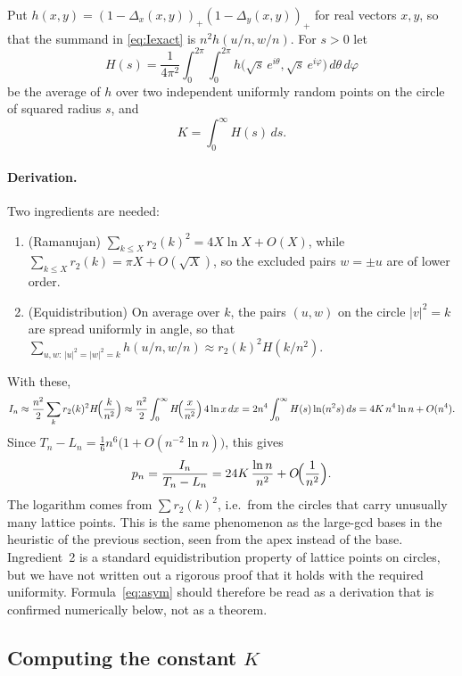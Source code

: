 \documentclass[11pt,a4paper]{article}
\theoremstyle{remark}
\begin{document}
Put $h(x,y)=(1-\Delta_x(x,y))_+(1-\Delta_y(x,y))_+$ for real vectors $x,y$, so that
the summand in \eqref{eq:Iexact} is $n^2h(u/n,w/n)$. For $s>0$ let
\[
  H(s)=\frac1{4\pi^2}\int_0^{2\pi}\!\!\int_0^{2\pi}
  h\bigl(\sqrt s\,e^{i\theta},\sqrt s\,e^{i\varphi}\bigr)\,d\theta\,d\varphi
\]
be the average of $h$ over two independent uniformly random points on the circle
of squared radius $s$, and
\[
  K=\int_0^\infty H(s)\,ds .
\]

\paragraph{Derivation.} Two ingredients are needed:
\begin{enumerate}
  \item (Ramanujan) $\displaystyle\sum_{k\le X}r_2(k)^2=4X\ln X+O(X)$, while
    $\sum_{k\le X}r_2(k)=\pi X+O(\sqrt X)$, so the excluded pairs $w=\pm u$ are of
    lower order.
  \item (Equidistribution) On average over $k$, the pairs $(u,w)$ on the circle
    $|v|^2=k$ are spread uniformly in angle, so that
    $\sum_{u,w:\,|u|^2=|w|^2=k}h(u/n,w/n)\approx r_2(k)^2H(k/n^2)$.
\end{enumerate}
With these,
\[
  I_n\approx\frac{n^2}{2}\sum_k r_2(k)^2H\!\Bigl(\frac k{n^2}\Bigr)
  \approx\frac{n^2}{2}\int_0^\infty H\!\Bigl(\frac x{n^2}\Bigr)\,4\ln x\,dx
  =2n^4\int_0^\infty H(s)\ln(n^2s)\,ds
  =4K\,n^4\ln n+O(n^4).
\]
Since $T_n-L_n=\tfrac16n^6\bigl(1+O(n^{-2}\ln n)\bigr)$, this gives
\begin{equation}\label{eq:asym}
  p_n=\frac{I_n}{T_n-L_n}=24K\,\frac{\ln n}{n^2}+O\!\Bigl(\frac1{n^2}\Bigr).
\end{equation}
The logarithm comes from $\sum r_2(k)^2$, i.e.\ from the circles that carry
unusually many lattice points. This is the same phenomenon as the large-gcd bases
in the heuristic of the previous section, seen from the apex instead of the base.
Ingredient~2 is a standard equidistribution property of lattice points on circles,
but we have not written out a rigorous proof that it holds with the required
uniformity. Formula~\eqref{eq:asym} should therefore be read as a derivation that
is confirmed numerically below, not as a theorem.

\subsection{Computing the constant $K$}
\end{document}
